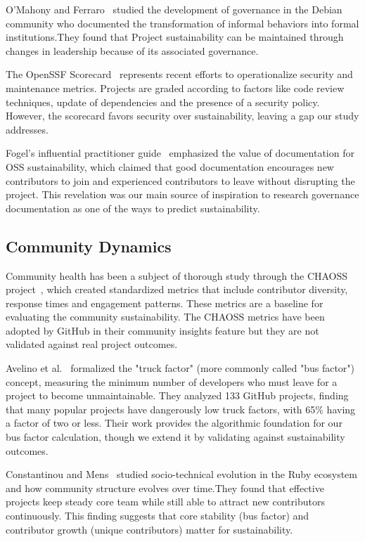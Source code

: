 \documentclass[conference]{IEEEtran}
\begin{document}
O'Mahony and Ferraro~\cite{omahony2007} studied the development of governance in the Debian community who documented the transformation of informal behaviors into formal institutions.They found that Project sustainability can be maintained through changes in leadership because of its associated governance.

The OpenSSF Scorecard~\cite{openssf} represents recent efforts to operationalize security and maintenance metrics.  Projects are graded according to factors like code review techniques, update of dependencies and the presence of a security policy. However,  the scorecard favors security over sustainability, leaving a gap our study addresses.

Fogel's influential practitioner guide~\cite{fogel2005} emphasized the value of documentation for OSS sustainability, which claimed that good documentation encourages new contributors to join and experienced contributors to leave without disrupting the project.  This revelation was our main source of inspiration to research governance documentation as one of the ways to predict sustainability.

\subsection{Community Dynamics}

Community health has been a subject of thorough study through the CHAOSS project~\cite{goggins2021}, which created standardized metrics that include contributor diversity, response times and engagement patterns. These metrics are a baseline for evaluating the community sustainability. The CHAOSS metrics have been adopted by GitHub in their community insights feature but they are not validated against real project outcomes.

Avelino et al.~\cite{avelino2016} formalized the "truck factor" (more commonly called "bus factor") concept, measuring the minimum number of developers who must leave for a project to become unmaintainable. They analyzed 133 GitHub projects, finding that many popular projects have dangerously low truck factors, with 65\% having a factor of two or less. Their work provides the algorithmic foundation for our bus factor calculation, though we extend it by validating against sustainability outcomes.

Constantinou and Mens~\cite{constantinou2017} studied socio-technical evolution in the Ruby ecosystem and how community structure evolves over time.They found that effective projects keep steady core team while still able to attract new contributors continuously. This finding suggests that core stability (bus factor) and contributor growth (unique contributors) matter for sustainability.
\end{document}
